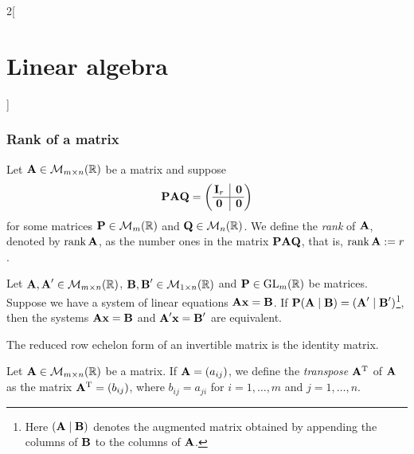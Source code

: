 \documentclass[../../../main.tex]{subfiles}
\begin{document}
\begin{multicols}{2}[\section{Linear algebra}]
  \subsubsection{Rank of a matrix}
  \begin{definition}[Rank]
    Let $\boldsymbol{\mathrm{A}}\in\mathcal{M}_{m\times n}(\mathbb{R})$ be a matrix and suppose
    $$\vectorfunction{P}\vectorfunction{A}\vectorfunction{Q}=\left(
      \begin{array}{@{\,} c|c @{\,}}
          \vectorfunction{I}_r & \vectorfunction{0} \\
          \hline
          \vectorfunction{0}   & \vectorfunction{0}
        \end{array}
      \right)$$ for some matrices $\boldsymbol{\mathrm{P}}\in\mathcal{M}_m(\mathbb{R})$ and $\boldsymbol{\mathrm{Q}}\in\mathcal{M}_n(\mathbb{R})$. We define the \emph{rank} of $\boldsymbol{\mathrm{A}}$, denoted by $\rank \boldsymbol{\mathrm{A}}$, as the number ones in the matrix $\boldsymbol{\mathrm{P}}\boldsymbol{\mathrm{A}}\boldsymbol{\mathrm{Q}}$, that is, $\rank\boldsymbol{\mathrm{A}}:=r$.
  \end{definition}
  \begin{prop}
    Let $\boldsymbol{\mathrm{A}},\boldsymbol{\mathrm{A}}'\in\mathcal{M}_{m\times n}(\mathbb{R})$, $\boldsymbol{\mathrm{B}},\boldsymbol{\mathrm{B}}'\in\mathcal{M}_{1\times n}(\mathbb{R})$ and $\boldsymbol{\mathrm{P}}\in\mathrm{GL}_m(\mathbb{R})$ be matrices. Suppose we have a system of linear equations $\boldsymbol{\mathrm{A}}\boldsymbol{\mathrm{x}}=\boldsymbol{\mathrm{B}}$. If $\boldsymbol{\mathrm{P}}(\boldsymbol{\mathrm{A}}\mid\boldsymbol{\mathrm{B}})=(\boldsymbol{\mathrm{A}}'\mid\boldsymbol{\mathrm{B}}')$\footnote{Here $(\boldsymbol{\mathrm{A}}\mid\boldsymbol{\mathrm{B}})$ denotes the augmented matrix obtained by appending the columns of $\boldsymbol{\mathrm{B}}$ to the columns of $\boldsymbol{\mathrm{A}}$.}, then the systems $\boldsymbol{\mathrm{A}}\boldsymbol{\mathrm{x}}=\boldsymbol{\mathrm{B}}$ and $\boldsymbol{\mathrm{A}}'\boldsymbol{\mathrm{x}}=\boldsymbol{\mathrm{B}}'$ are equivalent.
  \end{prop}
  \begin{corollary}
    The reduced row echelon form of an invertible matrix is the identity matrix.
  \end{corollary}
  \begin{definition}[Transposition]
    Let $\boldsymbol{\mathrm{A}}\in\mathcal{M}_{m\times n}(\mathbb{R})$ be a matrix. If $\boldsymbol{\mathrm{A}}=(a_{ij})$, we define the \emph{transpose} $\vb{A}^{\mathrm{T}}$ of $\boldsymbol{\mathrm{A}}$ as the matrix $\vb{A}^{\mathrm{T}}=(b_{ij})$, where $b_{ij}=a_{ji}$ for $i=1,\ldots,m$ and $j=1,\ldots,n$.
  \end{definition}

\end{multicols}
\end{document}
